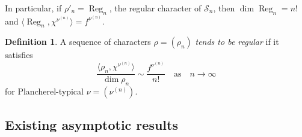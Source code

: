 \documentclass[12pt]%
{amsart}
\renewcommand\S{{\mathcal S}}
\DeclareMathOperator\Reg{Reg}
\newcommand{\la}{{\lambda}}
\theoremstyle{plain}
\theoremstyle{definition}
\newtheorem{definition}[theorem]{Definition}
\theoremstyle{remark}
\newcommand{\todo}[1]{\vspace{5 mm}\par \noindent
	\marginpar{\textsc{ToDo}} \framebox{\begin{minipage}[c]{0.95
				\textwidth}
			#1 \end{minipage}}\vspace{5 mm}\par}
\begin{document}
In particular, if $\rho'_n = \Reg_n$, the regular character of $\S_n$, then $\dim\Reg_n = n!$ and $\langle \Reg_n,\chi^{\nu^{(n)}}\rangle = f^{\nu^{(n)}}$.

\begin{definition}\label{def:regularity}
    A sequence of characters $\rho = (\rho_n)$ {\em tends to be regular} if it satisfies
    \begin{equation}\label{tends_to_regular}
        \frac{\langle \rho_n,\chi^{\nu^{(n)}} \rangle}{\dim\rho_n}
        \sim \frac{f^{\nu^{(n)}}}{n!}
        \quad \text{as} \quad n\to\infty
    \end{equation}
    for Plancherel-typical $\nu = (\nu^{(n)})$.   
  
\end{definition}










\subsection{Existing asymptotic results}


\end{document}
